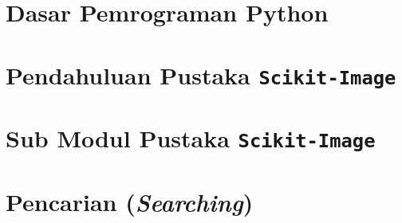 \chapter{Dasar Pemrograman Python}

\chapter{Pendahuluan Pustaka \texttt{Scikit-Image}}

\chapter{Sub Modul Pustaka \texttt{Scikit-Image}}


\chapter{Pencarian (\textit{Searching})}




